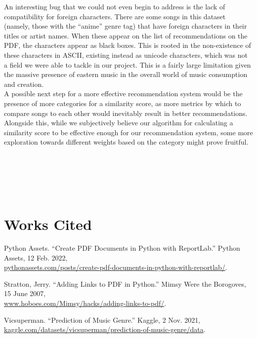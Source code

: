 \documentclass[fontsize=11pt]{article}
\begin{document}
\hspace{\parindent} An interesting bug that we could not even begin to address is the lack of compatibility for foreign characters. There are some songs in this dataset (namely, those with the “anime” genre tag) that have foreign characters in their titles or artist names. When these appear on the list of recommendations on the PDF, the characters appear as black boxes. This is rooted in the non-existence of these characters in ASCII, existing instead as unicode characters, which was not a field we were able to tackle in our project. This is a fairly large limitation given the massive presence of eastern music in the overall world of music consumption and creation. \\

\hspace{\parindent} A possible next step for a more effective recommendation system would be the presence of more categories for a similarity score, as more metrics by which to compare songs to each other would inevitably result in better recommendations. Alongside this, while we subjectively believe our algorithm for calculating a similarity score to be effective enough for our recommendation system, some more exploration towards different weights based on the category might prove fruitful. \\ \\ \\ \\ \\ \\

\section*{Works Cited}

\begin{hangparas}{.25in}{1}
Python Assets. “Create PDF Documents in Python with ReportLab.” Python Assets, 12 Feb. 2022, \\ \url{pythonassets.com/posts/create-pdf-documents-in-python-with-reportlab/}.
\end{hangparas}
\begin{hangparas}{.25in}{1}
Stratton, Jerry. “Adding Links to PDF in Python.” Mimsy Were the Borogoves, 15 June 2007, \\ \url{www.hoboes.com/Mimsy/hacks/adding-links-to-pdf/}. 
\end{hangparas}
\begin{hangparas}{.25in}{1}
Vicsuperman. “Prediction of Music Genre.” Kaggle, 2 Nov. 2021, \\ \url{kaggle.com/datasets/vicsuperman/prediction-of-music-genre/data}. 
\end{hangparas}
\end{document}
